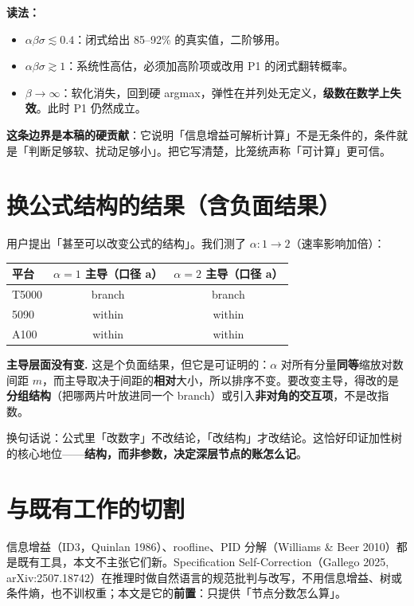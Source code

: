 \documentclass[12pt]{ctexart}
\begin{document}
\textbf{读法：}
\begin{itemize}
  \item $\alpha\beta\sigma\lesssim0.4$：闭式给出 85--92\% 的真实值，二阶够用。
  \item $\alpha\beta\sigma\gtrsim1$：系统性高估，必须加高阶项或改用 P1 的闭式翻转概率。
  \item $\beta\to\infty$：软化消失，回到硬 argmax，弹性在并列处无定义，\textbf{级数在数学上失效}。此时 P1 仍然成立。
\end{itemize}

\textbf{这条边界是本稿的硬贡献}：它说明「信息增益可解析计算」不是无条件的，条件就是「判断足够软、扰动足够小」。把它写清楚，比笼统声称「可计算」更可信。

\section{换公式结构的结果（含负面结果）}
\label{sec:structure}

用户提出「甚至可以改变公式的结构」。我们测了 $\alpha:1\to2$（速率影响加倍）：

\begin{table}[htbp]
\centering\small
\begin{tabular}{@{}lcc@{}}
\toprule
平台 & $\alpha=1$ 主导（口径 a） & $\alpha=2$ 主导（口径 a） \\
\midrule
T5000 & branch & branch \\
5090  & within & within \\
A100  & within & within \\
\bottomrule
\end{tabular}
\end{table}

\textbf{主导层面没有变.} 这是个负面结果，但它是可证明的：$\alpha$ 对所有分量\textbf{同等}缩放对数间距 $m$，而主导取决于间距的\textbf{相对}大小，所以排序不变。要改变主导，得改的是\textbf{分组结构}（把哪两片叶放进同一个 branch）或引入\textbf{非对角的交互项}，不是改指数。

换句话说：公式里「改数字」不改结论，「改结构」才改结论。这恰好印证加性树的核心地位——\textbf{结构，而非参数，决定深层节点的账怎么记}。

\section{与既有工作的切割}

信息增益（ID3，Quinlan 1986）、roofline、PID 分解（Williams \& Beer 2010）都是既有工具，本文不主张它们新。Specification Self-Correction（Gallego 2025, arXiv:2507.18742）在推理时做自然语言的规范批判与改写，不用信息增益、树或条件熵，也不训权重；本文是它的\textbf{前置}：只提供「节点分数怎么算」。
\end{document}
